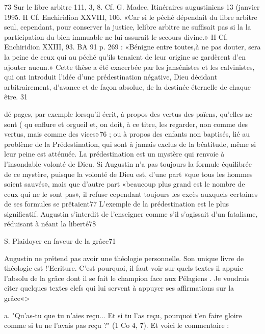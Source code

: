 73 Sur le libre arbitre 111, 3, 8. Cf. G. Madec, Itinéraires augustiniens 13 (janvier 1995.
H Cf. Enchiridion XXVIII, 106. «Car si le péché dépendait du libre arbitre seul, cependant, pour conserver la justice, lelibre arbitre ne suffisait pas si la la participation du bien immuable ne lui assurait le secours divine.»
H Cf. Enchiridion XXIII, 93. BA 91 p. 269 : «Bénigne entre toutes,à ne pas douter, sera la peine de ceux qui au péché qu'ils tenaient de leur origine se gardèrent d'en ajouter aucun.» Cette thèse a été exacerbée par les jansénistes et les calvinistes, qui ont introduit l'idée d'une prédestination négative, Dieu décidant arbitrairement, d'avance et de façon absolue, de
la destinée éternelle de chaque être.
31
 
dé pages, par exemple lorsqu'il écrit, à propos des vertus des païens, qu'elles ne sont	(
qu enflure et orgueil et, on doit, à ce titre, les regarder, non comme des vertus, mais
comme des vices»76 ; ou à propos des enfants non baptisés, lié au problème de la Prédestination, qui sont à jamais exclus de la béatitude, même si leur peine est
atténuée. La prédestination est un mystère qui renvoie à l'insondable volonté de Dieu. Si Augustin n'a pas toujours la formule équilibrée de ce mystère, puisque la volonté de Dieu est, d'une part «que tous les hommes soient sauvés», mais que d'autre part
«beaucoup plus grand est le nombre de ceux qui ne le sont pas», il refuse cependant toujours les excès auxquels certaines de ses formules se prêtaient77  L'exemple de la prédestination est le plus significatif. Augustin s'interdit de l'enseigner comme s'il s'agissait d'un fatalisme, réduisant à néant la liberté78 

S. Plaidoyer  en faveur de la grâce71

Augustin ne prétend pas avoir une théologie personnelle. Son unique livre de théologie est !'Ecriture. C'est pourquoi, il faut voir sur quels textes il appuie l'absolu de la grâce dont il se fait le champion face aux Pélagiens . Je voudrais citer quelques textes clefs qui lui servent à appuyer ses affirmations sur la grâce«>

a.	"Qu'as-tu que tu n'aies reçu... Et si tu l'as reçu, pourquoi t'en faire gloire comme si tu ne l'avais pas reçu ?" (1 Co 4, 7). Et voici le commentaire :

